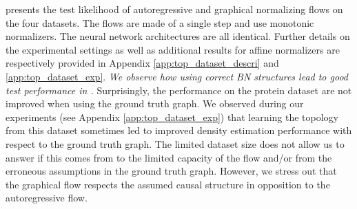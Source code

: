  presents the test likelihood of autoregressive and graphical normalizing flows on the four datasets. The flows are made of a single step and use monotonic normalizers. The neural network architectures are all identical. Further details on the experimental settings as well as additional results for affine normalizers are respectively provided in Appendix \ref{app:top_dataset_descri} and \ref{app:top_dataset_exp}. \emph{We observe how using correct BN structures lead to good test performance in .} %
Surprisingly, the performance on the protein dataset are not improved when using the ground truth graph. We observed during our experiments (see Appendix \ref{app:top_dataset_exp}) that learning the topology from this dataset sometimes led to improved density estimation performance with respect to the ground truth graph. The limited dataset size does not allow us to answer if this comes from to the limited capacity of the flow and/or from the erroneous assumptions in the ground truth graph. However, we stress out that the graphical flow respects the assumed causal structure in opposition to the autoregressive flow.



